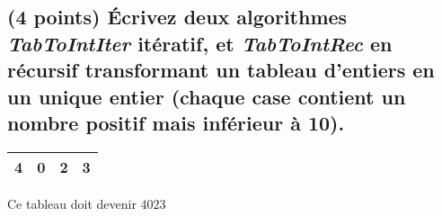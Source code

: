 \documentclass[11pt,a4paper]{article}
\begin{document}

\vfillLast
\newpage

\subsection{(4 points) \'Ecrivez deux algorithmes \og \textit{TabToIntIter} \fg{} itératif, et \og \textit{TabToIntRec} \fg{} en récursif transformant un tableau d'entiers en un unique entier (chaque case contient un nombre positif mais inférieur à 10). }

\medskip

\begin{center}
  \begin{tabular}{| c | c | c | c |}
    \hline
    4 & 0 & 2 & 3 \\
    \hline
  \end{tabular}

  \smallskip

  Ce tableau doit devenir $ 4023 $
\end{center}

\medskip

\begin{center}
\end{center}
\end{document}
